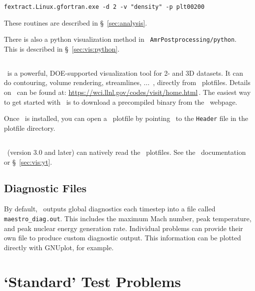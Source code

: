 \begin{verbatim}
fextract.Linux.gfortran.exe -d 2 -v "density" -p plt00200
\end{verbatim}

These routines are described in \S~\ref{sec:analysis}.

There is also a python visualization method in {\tt
AmrPostprocessing/python}.  This is described
in \S~\ref{sec:vis:python}.


\subsection{\visit}

\visit\ is a powerful, DOE-supported visualization tool for 2- and 3D
datasets.  It can do contouring, volume rendering, streamlines, ...\, ,
directly from \boxlib\ plotfiles.   Details on
\visit\ can be found at:\newline
 \url{https://wci.llnl.gov/codes/visit/home.html}\,. \newline
The easiest way to get started with \visit\ is to download a precompiled
binary from the \visit\ webpage.

Once \visit\ is installed, you can open a \boxlib\ plotfile by pointing
\visit\ to the {\tt Header} file in the plotfile directory.


\subsection{\yt}

\yt\ (version 3.0 and later) can natively read the \maestro\ plotfiles.  See
the \yt\ documentation or \S~\ref{sec:vis:yt}.



\subsection{Diagnostic Files}

By default, \maestro\ outputs global diagnostics each timestep into a
file called {\tt maestro\_diag.out}.  This includes the maximum Mach
number, peak temperature, and peak nuclear energy generation rate.
Individual problems can provide their own  file to
produce custom diagnostic output.  This information can be plotted
directly with {\sf GNUplot}, for example.




\section{`Standard' Test Problems}

